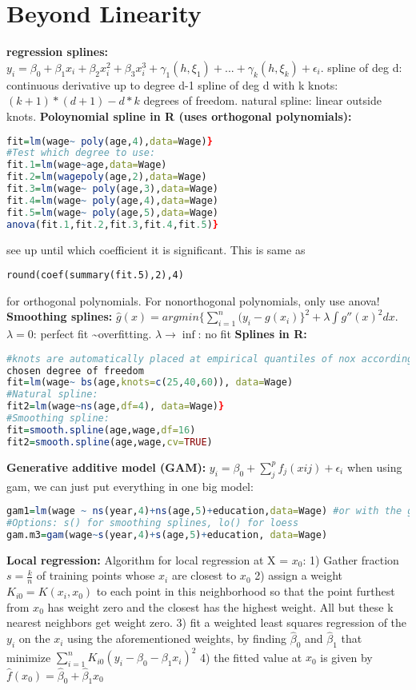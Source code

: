 \section{Beyond Linearity}
\textbf{regression splines: } 
$y_i = \beta_0 + \beta_1x_i + \beta_2x_i^2 + \beta_3x_i^3 + \gamma_1(h, \xi_1) + ... + \gamma_k(h, \xi_k) + \epsilon_i$.
spline of deg d: continuous derivative up to degree d-1
spline of deg d with k knots: $(k+1)*(d+1)-d*k$ degrees of freedom. 
natural spline: linear outside knots. 
\textbf{Poloynomial spline in R (uses orthogonal polynomials):} \begin{lstlisting}[language=R]
fit=lm(wage~ poly(age,4),data=Wage)}
#Test which degree to use:
fit.1=lm(wage~age,data=Wage)
fit.2=lm(wagepoly(age,2),data=Wage)
fit.3=lm(wage~ poly(age,3),data=Wage)
fit.4=lm(wage~ poly(age,4),data=Wage)
fit.5=lm(wage~ poly(age,5),data=Wage)
anova(fit.1,fit.2,fit.3,fit.4,fit.5)}\end{lstlisting} see up until which coefficient it is significant. This is same as \begin{lstlisting}
round(coef(summary(fit.5),2),4)
\end{lstlisting} for orthogonal polynomials. For nonorthogonal polynomials, only use anova!
\textbf{Smoothing splines: } $\hat g(x) = argmin \{\sum_{i=1}^n (y_i - g(x_i)\}^2 + \lambda \int g'' (x)^2 dx$. $\lambda = 0$: perfect fit \textasciitilde overfitting. $\lambda \rightarrow \inf$: no fit 
\textbf{Splines in R:}
\begin{lstlisting}[language=R] 
#knots are automatically placed at empirical quantiles of nox according to the
chosen degree of freedom
fit=lm(wage~ bs(age,knots=c(25,40,60)), data=Wage)
#Natural spline: 
fit2=lm(wage~ns(age,df=4), data=Wage)}
#Smoothing spline:
fit=smooth.spline(age,wage,df=16)
fit2=smooth.spline(age,wage,cv=TRUE)
\end{lstlisting}
\textbf{Generative additive model (GAM): } $y_i = \beta_0 + \sum_j^p f_j(xij) + \epsilon_i$
when using gam, we can just put everything in one big model:
\begin{lstlisting}[language=R]
gam1=lm(wage ~ ns(year,4)+ns(age,5)+education,data=Wage) #or with the gam library: 
#Options: s() for smoothing splines, lo() for loess
gam.m3=gam(wage~s(year,4)+s(age,5)+education, data=Wage)\end{lstlisting}

\textbf{Local regression: }
Algorithm for local regression at X = $x_0$: 1) Gather fraction $s = \frac{k}{n}$ of training points whose $x_i$ are closest to $x_0$ 2) assign a weight $K_{i0} = K(x_i, x_0)$ to each point in this neighborhood so that the point furthest from $x_0$ has weight zero and the closest has the highest weight. All but these k nearest neighbors get weight zero. 3) fit a weighted least squares regression of the $y_i$ on the $x_i$ using the aforementioned weights, by finding $\hat \beta_0$ and $\hat \beta_1$ that minimize $\sum_{i=1}^n K_{i0}(y_i-\beta_0-\beta_1x_i)^2$ 4) the fitted value at $x_0$ is given by $\hat f(x_0) = \hat \beta_0 + \hat \beta_1 x_0$